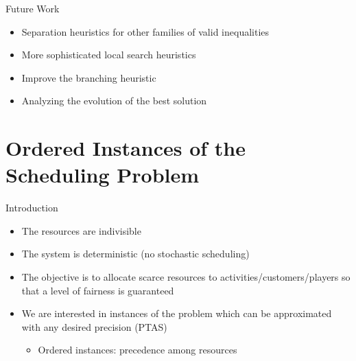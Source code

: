 \documentclass[10pt]{beamer}
\begin{document}
\begin{frame}{Future Work}
\begin{itemize}
    \item<1-> Separation heuristics for other families of valid inequalities
    \item<2-> More sophisticated local search heuristics
    \item<3-> Improve the branching heuristic
    \item<4-> Analyzing the evolution of the best solution
\end{itemize}
\end{frame}


\section{Ordered Instances of the Scheduling Problem}

\begin{frame}{Introduction}
	\begin{itemize}
    	\item<1-> The resources are indivisible
        \item<2-> The system is deterministic (no stochastic scheduling)
        \item<3-> The objective is to allocate scarce resources to activities/customers/players so that a level of \alert{fairness} is guaranteed
    	\item<4-> We are interested in instances of the problem which can be approximated with any desired precision (PTAS)
		\begin{itemize}
        	\item<5-> \alert{Ordered instances}: precedence among resources
        \end{itemize}
    \end{itemize}

\end{frame}
\end{document}
